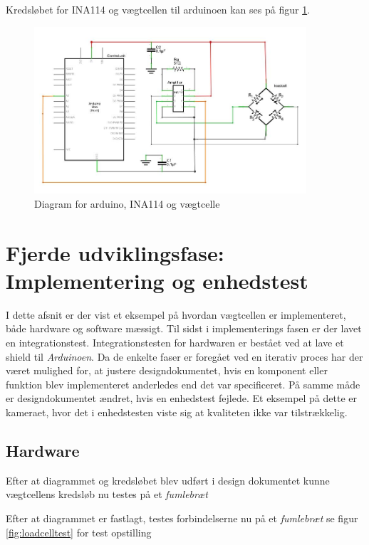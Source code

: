  Kredsløbet for INA114 og vægtcellen til arduinoen kan ses på figur \ref{fig:loadcelldiagram}.
 
  \begin{figure}[H]
	\centering
	\includegraphics[width=0.9\textwidth]{billeder/Hardware/diagrammer/loadcelldiagram.JPG}
	\caption{Diagram for arduino, INA114 og vægtcelle}
	\label{fig:loadcelldiagram}
\end{figure}



\newpage
\section{Fjerde udviklingsfase: Implementering og enhedstest}
\label{subsec:Implement}
I dette afsnit er der vist et eksempel på hvordan vægtcellen er implementeret, både hardware og software mæssigt. Til sidst i implementerings fasen er der lavet en integrationstest. Integrationstesten for hardwaren er bestået ved at lave et shield til \textit{Arduinoen}. Da de enkelte faser er foregået ved en iterativ proces har der været mulighed for, at justere designdokumentet, hvis en komponent eller funktion blev implementeret anderledes end det var specificeret. På samme måde er designdokumentet ændret, hvis en enhedstest fejlede. Et eksempel på dette er kameraet, hvor det i enhedstesten viste sig at kvaliteten ikke var tilstrækkelig.  

\subsection{Hardware}
Efter at diagrammet og kredsløbet blev udført i design dokumentet kunne vægtcellens kredsløb nu testes på et \textit{fumlebræt} 

Efter at diagrammet er fastlagt, testes forbindelserne nu på et \textit{fumlebræt} se figur \ref{fig:loadcelltest} for test opstilling

